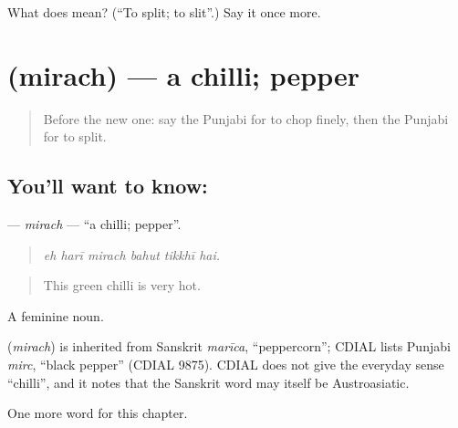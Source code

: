 \begin{tcolorbox}[breakable,colback=teal!4,colframe=teal!35!black,title={Before you move on}]
What does  mean? (\textquotedblleft{}To split; to slit\textquotedblright{}.) Say it once more.
\end{tcolorbox}
\section[\texorpdfstring{\pa{ਮਿਰਚ} (mirach)}{ਮਿਰਚ (mirach)}]{ (mirach) — a chilli; pepper}

\label{lesson:PA-C241-mirach}



\begin{quote}
Before the new one: say the Punjabi for to chop finely, then the Punjabi for to split.
\end{quote}

\subsection*{You'll want to know: }
\textbf{} — \emph{mirach} — \textquotedblleft{}a chilli; pepper\textquotedblright{}.

\begin{quote}
     
\end{quote}

\begin{quote}
\emph{eh harī mirach bahut tikkhī hai.}
\end{quote}

\begin{quote}
This green chilli is very hot.
\end{quote}

A feminine noun.

\begin{cousinweb}
\textbf{} (\emph{mirach}) is inherited from Sanskrit \emph{marīca}, \textquotedblleft{}peppercorn\textquotedblright{}; CDIAL lists Punjabi \emph{mirc}, \textquotedblleft{}black pepper\textquotedblright{} (CDIAL 9875). CDIAL does not give the everyday sense \textquotedblleft{}chilli\textquotedblright{}, and it notes that the Sanskrit word may itself be Austroasiatic.
\end{cousinweb}

\begin{grammarlens}[title={What you've built}]
One more word for this chapter.
\end{grammarlens}

